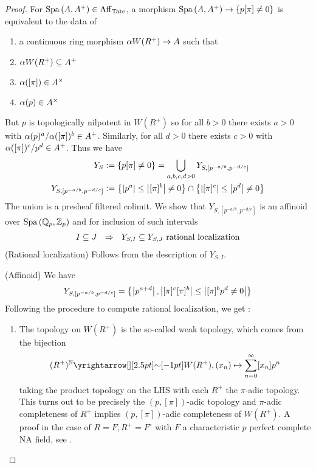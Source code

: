 \documentclass{article}
\begin{document}
\begin{proof}
  For $\mathrm{Spa}\,(A , A^+) \in \mathrm{Aff}_{\mathrm{Tate}}$,
  a morphism $\mathrm{Spa}\,(A , A^+) \to \left\{p [\pi] \neq 0\right\}$
  is equivalent to the data of 
  \begin{enumerate}
    \item a continuous ring morphism $\alpha W(R^+) \to A$ such that
    \item $\alpha W(R^+) \subseteq A^+$
    \item $\alpha([\pi]) \in A^\times$
    \item $\alpha(p) \in A^\times$
  \end{enumerate}
  But $p$ is topologically nilpotent in $W(R^+)$ 
  so for all $b > 0$ there exists
  $a > 0$ with $\alpha(p)^a / \alpha([\pi])^b \in A^+$.
  Similarly, for all $d > 0$ there exists $c > 0$ with
  $\alpha([\pi])^c / p^d \in A^+$.
  Thus we have \begin{align*}
    Y_S &:= \left\{p [\pi] \neq 0\right\} = 
    \bigcup_{a, b, c, d > 0} Y_{S , [p^{- a / b} , p^{- d / c}]} \\
    Y_{S , [p^{- a / b} , p^{- d / c}]} 
      &:= \left\{\left\vert p^a \right\vert \leq \left\vert [\pi]^b \right\vert \neq 0\right\} \cap 
    \left\{\left\vert [\pi]^c \right\vert \leq \left\vert p^d \right\vert \neq 0\right\}
  \end{align*}
  The union is a presheaf filtered colimit.
  We show that $Y_{S , [p^{- a / b} , p^{- d / c}]}$
  is an affinoid over $\mathrm{Spa}\,(\mathbb{Q}_p , \mathbb{Z}_p)$
  and for inclusion of such intervals
  \begin{align*}
    I \subseteq J
    \,\,\,\,\Rightarrow \,\,\,\,
    Y_{S, I} \subseteq 
    Y_{S , J}
    \text{ rational localization}
  \end{align*}
  (Rational localization) 
  Follows from the description of $Y_{S , I}$.

  (Affinoid) We have \begin{align*}
    Y_{S, [p^{- a / b} , p^{- d / c}]}
    = \left\{
      \left\vert {p}^{a + d} \right\vert , \left\vert [\pi]^{c}[\pi]^b \right\vert \leq \left\vert [\pi]^b p^d \neq 0 \right\vert
      \right\}
  \end{align*}
  Following the procedure to compute rational localization, we get : 
  \begin{enumerate}
    \item The topology on $W(R^+)$ is the so-called weak topology,
    which comes from the bijection \[
      (R^+)^{\bN} \map{\sim}{} W(R^+) , (x_n) \mapsto \sum_{n = 0}^\infty [x_n] p^n
    \]
    taking the product topology on the LHS with each $R^+$ 
    the $\pi$-adic topology.
    This turns out to be precisely the $(p , [\pi])$-adic topology
    and $\pi$-adic completeness of $R^+$ implies
    $(p , [\pi])$-adic completeness of $W(R^+)$.
    A proof in the case of $R = F , R^+ = F^\circ$
    with $F$ a characteristic $p$ perfect complete NA field,
    see \cite[Prop. 1.4.11]{FF18}.


\end{enumerate}
\end{proof}
\end{document}
